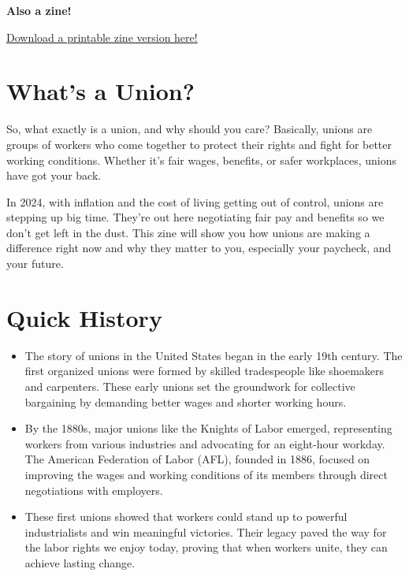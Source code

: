 \documentclass[
]{book}
\newenvironment{blackbox}{
  \definecolor{shadecolor}{rgb}{0, 0, 0}
  \color{white}
  \begin{shaded}
  }
 {\end{shaded}}
\theoremstyle{definition}
\theoremstyle{definition}
\theoremstyle{definition}
\theoremstyle{definition}
\theoremstyle{remark}
\begin{document}
\begin{blackbox}

\begin{center}
\textbf{Also a zine!}

\end{center}

\href{https://drive.google.com/file/d/1wXIRAbr46yWSbznjlVGr2UZJftnKJ8F5/view?usp=sharing}{Download a printable zine version here!}

\end{blackbox}

\section{What's a Union?}\label{whats-a-union}

So, what exactly is a union, and why should you care? Basically, unions are groups of workers who come together to protect their rights and fight for better working conditions. Whether it's fair wages, benefits, or safer workplaces, unions have got your back.

In 2024, with inflation and the cost of living getting out of control, unions are stepping up big time. They're out here negotiating fair pay and benefits so we don't get left in the dust. This zine will show you how unions are making a difference right now and why they matter to you, especially your paycheck, and your future.

\section{Quick History}\label{quick-history}

\begin{itemize}
\item
  The story of unions in the United States began in the early 19th century. The first organized unions were formed by skilled tradespeople like shoemakers and carpenters. These early unions set the groundwork for collective bargaining by demanding better wages and shorter working hours.
\item
  By the 1880s, major unions like the Knights of Labor emerged, representing workers from various industries and advocating for an eight-hour workday. The American Federation of Labor (AFL), founded in 1886, focused on improving the wages and working conditions of its members through direct negotiations with employers.
\item
  These first unions showed that workers could stand up to powerful industrialists and win meaningful victories. Their legacy paved the way for the labor rights we enjoy today, proving that when workers unite, they can achieve lasting change.
\end{itemize}
\end{document}
